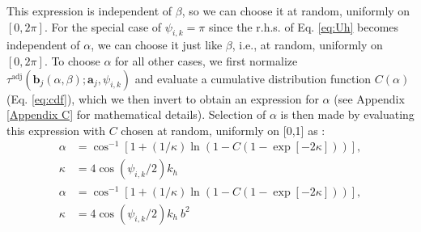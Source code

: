             This expression is independent of $\beta$, so we can choose it at random, uniformly on $[0, 2\pi]$. For the special case of $\psi_{i,k} = \pi$ since the r.h.s. of Eq. \eqref{eq:Uh} becomes independent of $\alpha$, we can choose it just like $\beta$, i.e., at random, uniformly on $[0, 2\pi]$. To choose $\alpha$ for all other cases, we first normalize $\tau^\text{adj} \left( {\mathbf b}_j(\alpha, \beta); \mathbf{a}_j, \psi_{i,k} \right) $ and evaluate a cumulative distribution function $C(\alpha)$ (Eq. \eqref{eq:cdf}), which we then invert to obtain an expression for $\alpha$ (see Appendix \ref{Appendix C} for mathematical details). Selection of $\alpha$ is then made by evaluating this expression with $C$ chosen at random, uniformly on [0,1] as :
                    \ifkhExplicitP
                        \begin{equation}
                        \label{eq:alpha}
                            \begin{aligned}
                                \alpha &= \cos^{-1} \left[1 +  (1/\kappa)\ln\left(1 - C (1-\exp[-2\kappa]) \right) \right],\\
                                \kappa &= 4 \cos(\psi_{i,k}/2) k_h
                            \end{aligned}
                        \end{equation}
                    \else
                        \begin{equation}
                        \label{eq:alpha}
                            \begin{aligned}
                                \alpha &= \cos^{-1} \left[1 +  (1/\kappa)\ln\left(1 - C (1-\exp[-2\kappa]) \right) \right],\\
                                \kappa &= 4 \cos(\psi_{i,k}/2) k_h~b^2
                            \end{aligned}
                        \end{equation}
                    \fi


